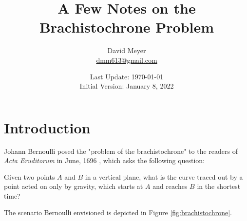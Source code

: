 \documentclass{article}
\title{A Few Notes on the Brachistochrone Problem}
\author{David Meyer \\ \href{mailto:dmm613@gmail.com}
                            {dmm613@gmail.com}}
\date{Last Update: \today \\
	 {\vspace{1.00mm} \small Initial Version: January 8, 2022}}
\theoremstyle{definition}
\begin{document}
\maketitle
%
%
%
\section{Introduction}
Johann Bernoulli posed the "problem of the brachistochrone" to the
readers of \emph{Acta Eruditorum} in June, 1696 \cite{1696acta}, 
which asks the following question:

\bigskip 
\begin{addmargin}[2em]{7em}                                                                             %
Given two points $A$ and $B$ in a vertical plane, what is the
curve traced out by a point acted on only by gravity, which
starts at $A$ and reaches $B$ in the shortest time?  
\end{addmargin}


\bigskip
\noindent
The scenario Bernoulli envisioned is depicted in Figure
\ref{fig:brachistochrone}. 
\end{document}
